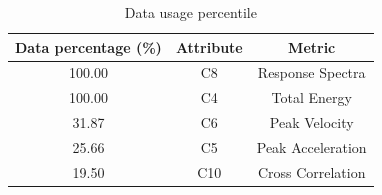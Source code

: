 \begin{table}
\centering
\caption{Data usage percentile}
\begin{tabular}{ccc}
\hline
Data percentage (\%) & Attribute & Metric                \\ \hline
100.00                 & C8        & Response Spectra      \\
100.00                 & C4        & Total Energy                \\ 
31.87                 & C6        & Peak Velocity      \\
25.66                 & C5        & Peak Acceleration      \\
19.50                 & C10        & Cross Correlation       \\\hline
\end{tabular}
\label{tab:attribute_usage_2}
\end{table}





